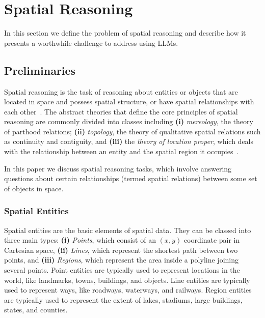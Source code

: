 \section{Spatial Reasoning}
\label{section:background}

In this section we define the problem of spatial reasoning and describe how it presents a worthwhile challenge to address using LLMs.

\subsection{Preliminaries}
Spatial reasoning is the task of reasoning about entities or objects that are located in space and possess spatial structure, or have spatial relationships with each other~\cite{Varzi2007}.
The abstract theories that define the core principles of spatial reasoning are commonly divided into classes including 
\textbf{(i)} \textit{mereology}, the theory of parthood relations;
\textbf{(ii)} \textit{topology}, the theory of qualitative spatial relations such as continuity and contiguity, and 
\textbf{(iii)} the \textit{theory of location proper}, which deals with the relationship between an entity and the spatial region it
occupies~\cite{Varzi2007}.

In this paper we discuss spatial reasoning tasks, which involve answering questions about certain relationships (termed spatial relations) between some set of objects in space.



\subsubsection{Spatial Entities}
Spatial entities are the basic elements of spatial data.
They can be classed into three main types: \textbf{(i)} \textit{Points}, which consist of an $(x,y)$ coordinate pair in Cartesian space, \textbf{(ii)} \textit{Lines}, which represent the shortest path between two points, and \textbf{(iii)} \textit{Regions}, which represent the area inside a polyline joining several points. 
Point entities are typically used to represent locations in the world, like landmarks, towns, buildings, and objects.
Line entities are typically used to represent ways, like roadways, waterways, and railways.
Region entities are typically used to represent the extent of lakes, stadiums, large buildings, states, and counties.



